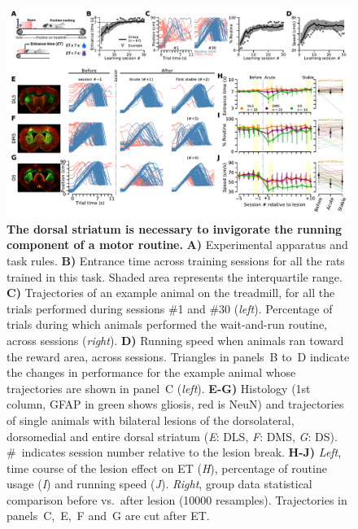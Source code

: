 \begin{figure}[bth!]
	\begin{center}
		\includegraphics[width=\textwidth]{ch-lesion/figures/Task_Example_Group.pdf}
		\caption
		{\textbf{The dorsal striatum is necessary to invigorate the running component of a motor routine.}
		\textbf{A)} Experimental apparatus and task rules.
		\textbf{B)} Entrance time across training sessions for all the rats trained in this task.
		Shaded area represents the interquartile range.
		\textbf{C)} Trajectories of an example animal on the treadmill, for all the trials performed during sessions \#1 and \#30 (\textit{left}).
		Percentage of trials during which animals performed the wait-and-run routine, across sessions (\textit{right}).
		\textbf{D)} Running speed when animals ran toward the reward area, across sessions.
		Triangles in panels~B to~D indicate the changes in performance for the example animal whose trajectories are shown in panel~C (\textit{left}).
		\textbf{E-G)} Histology (1st column, GFAP in green shows gliosis, red is NeuN) and trajectories of single animals with bilateral lesions of the dorsolateral, dorsomedial and entire dorsal striatum (\textit{E}: DLS, \textit{F}: DMS, \textit{G}: DS).
		\#~indicates session number relative to the lesion break.
		\textbf{H-J)} \textit{Left}, time course of the lesion effect on ET (\textit{H}), percentage of routine usage (\textit{I}) and running speed (\textit{J}).
		\textit{Right}, group data statistical comparison before vs.\ after lesion (10000 resamples).
		Trajectories in panels~C,~E,~F and~G are cut after ET.
		}
		\label{fig:lesion:task}
	\end{center}
\end{figure}